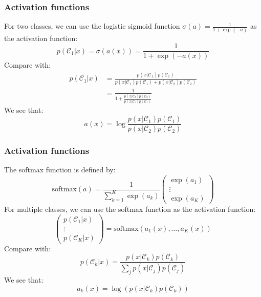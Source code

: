 \documentclass{beamer}
\begin{document}
\begin{frame}
    \frametitle{Activation functions}
    For two classes, we can use the logistic sigmoid function $\sigma(a)=\frac{1}{1+\exp(-a)}$ as the activation function:
    \begin{equation*}
        p(\mathcal{C}_{1}|x)=\sigma(a(x))=\frac{1}{1+\exp(-a(x))}
    \end{equation*}
    Compare with:
    \begin{align*}
        p(\mathcal{C}_{1}|x)&=\frac{p(x|\mathcal{C}_{1})p(\mathcal{C}_{1})}{p(x|\mathcal{C}_{1})p(\mathcal{C}_{1})+p(x|\mathcal{C}_{2})p(\mathcal{C}_{2})} \\
        &=\frac{1}{1+\frac{p(x|\mathcal{C}_{2})p(\mathcal{C}_{2})}{p(x|\mathcal{C}_{1})p(\mathcal{C}_{1})}}
    \end{align*}
    We see that:
    \begin{equation*}
        a(x)=\log\frac{p(x|\mathcal{C}_{1})p(\mathcal{C}_{1})}{p(x|\mathcal{C}_{2})p(\mathcal{C}_{2})}
    \end{equation*}
\end{frame}

\begin{frame}
    \frametitle{Activation functions}
    The softmax function is defined by:
    \begin{equation*}
        \mathrm{softmax}(a)=\frac{1}{\sum_{k=1}^{K}\exp(a_{k})}\begin{pmatrix}
            \exp(a_{1}) \\
            \vdots \\
            \exp(a_{K})
        \end{pmatrix}
    \end{equation*}
    For multiple classes, we can use the softmax function as the activation function:
    \begin{equation*}
        \begin{pmatrix}
            p(\mathcal{C}_{1}|x) \\
            \vdots \\
            p(\mathcal{C}_{K}|x)
        \end{pmatrix}
        =\mathrm{softmax}(a_{1}(x),\hdots,a_{K}(x))
    \end{equation*}
    Compare with:
    \begin{equation*}
        p(\mathcal{C}_{k}|x)=\frac{p(x|\mathcal{C}_{k})p(\mathcal{C}_{k})}{\sum_{j}p(x|\mathcal{C}_{j})p(\mathcal{C}_{j})}
    \end{equation*}
    We see that:
    \begin{equation*}
        a_{k}(x)=\log(p(x|\mathcal{C}_{k})p(\mathcal{C}_{k}))
    \end{equation*}
\end{frame}
\end{document}
